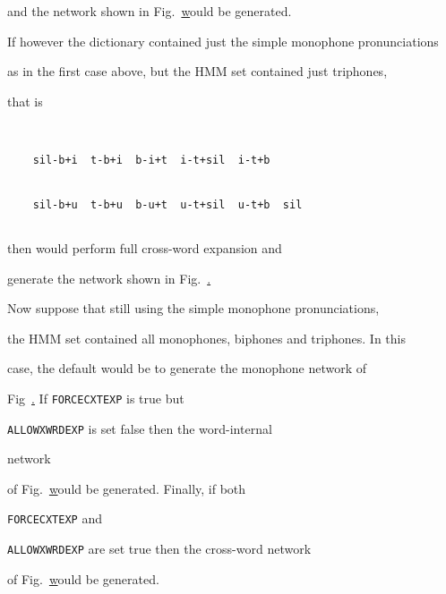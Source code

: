 and the network shown in Fig.~\href{f:wintnet} would be generated.










If however the dictionary contained just the simple monophone pronunciations


as in the first case above, but the HMM set contained just triphones,


that is


\begin{verbatim}


    sil-b+i  t-b+i  b-i+t  i-t+sil  i-t+b  


    sil-b+u  t-b+u  b-u+t  u-t+sil  u-t+b  sil


\end{verbatim}


then  would perform full cross-word expansion and


generate the network shown in Fig.~\href{f:xwrdnet}.










Now suppose that still using the simple monophone pronunciations,


the HMM set contained all monophones, biphones and triphones.  In this


case, the default would be to generate the monophone network of


Fig~\href{f:mononet}.  If \texttt{FORCECXTEXP} is true but 


\texttt{ALLOWXWRDEXP} is set false then the word-internal 


network


of Fig.~\href{f:wintnet} would be generated.  Finally, if both


\texttt{FORCECXTEXP}  and 


\texttt{ALLOWXWRDEXP} are set true then the cross-word network




of Fig.~\href{f:xwrdnet} would be generated. 





